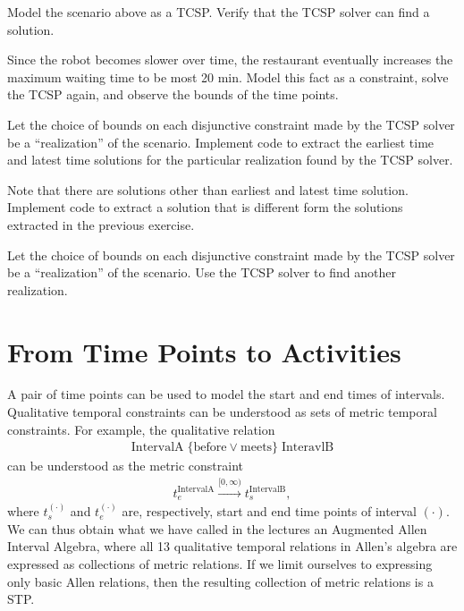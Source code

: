 \documentclass[a4paper]{article}
\begin{document}
{\ex{}\label{ex:ex3}  
Model the scenario above as a TCSP. Verify that the TCSP solver can find a solution.
\vspace{0.1cm}}

{\ex{}\label{ex:ex4}
Since the robot becomes slower over time, the restaurant eventually increases the maximum waiting time to be most 20 min. Model this fact as a constraint, solve the TCSP again, and observe the bounds of the time points.
\vspace{0.1cm}}

{\ex{}\label{ex:ex5}
Let the choice of bounds on each disjunctive constraint made by the TCSP solver be a ``realization'' of the scenario.  Implement code to extract the earliest time and latest time solutions for the particular realization found by the TCSP solver.
\vspace{0.1cm}}

{\ex{}\label{ex:ex6}
Note that there are solutions other than earliest and latest time solution. Implement code to extract a solution that is different form the solutions extracted in the previous exercise.
\vspace{0.1cm}}

{\ex{}\label{ex:ex7}
Let the choice of bounds on each disjunctive constraint made by the TCSP solver be a ``realization'' of the scenario.  Use the TCSP solver to find another realization.
\vspace{0.1cm}}


\section{From Time Points to Activities}
A pair of time points can be used to model the start and end times of intervals.  Qualitative temporal constraints can be understood as sets of metric temporal constraints.  For example, the qualitative relation
\begin{align}
\text{IntervalA} \;\{\text{before} \vee \text{meets}\}\; \text{InteravlB}\nonumber
\end{align}
can be understood as the metric constraint
\begin{align}
t_e^{\text{IntervalA}} \xrightarrow{[0,\infty)} t_s^{\text{IntervalB}},\nonumber
\end{align}
where $t_s^{(\cdot)}$ and $t_e^{(\cdot)}$ are, respectively, start and end time points of interval $(\cdot)$.  We can thus obtain what we have called in the lectures an Augmented Allen Interval Algebra, where all 13 qualitative temporal relations in Allen's algebra are expressed as collections of metric relations.  If we limit ourselves to expressing only basic Allen relations, then the resulting collection of metric relations is a STP.
\end{document}
